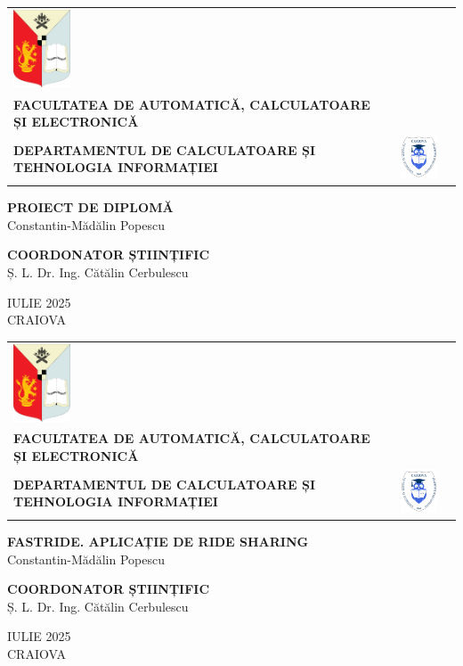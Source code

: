 \newcommand{\headerpage}[1]
{
\begin{center}
  \begin{tabular}{m{2cm} m{10cm} m{2cm}}
    \includegraphics[width=1.7cm]{Assets/left-logo.png} &
    \centering
    {\fontsize{10pt}{10pt}\selectfont
      \textbf{UNIVERSITATEA DIN CRAIOVA} \\[0.3em]
      \textbf{FACULTATEA DE AUTOMATICĂ, CALCULATOARE ȘI ELECTRONICĂ} \\[0.7em]
      \textbf{DEPARTAMENTUL DE CALCULATOARE ȘI TEHNOLOGIA INFORMAȚIEI}
    } &
    \includegraphics[width=1.7cm]{Assets/right-logo.png}
  \end{tabular}
\end{center}

\vspace{4cm}

\begin{center}
  {\fontsize{14pt}{14pt}\selectfont
   \textbf{#1} \\[1em]
  {Constantin-Mădălin Popescu}
  }
\end{center}

\vspace{3cm}

\begin{center}
   {\fontsize{12pt}{12pt}\selectfont
   \textbf{COORDONATOR ȘTIINȚIFIC} \\[1em]
   {Ș. L. Dr. Ing. Cătălin Cerbulescu}
   }
\end{center}

\vfill

\begin{center}
  {\fontsize{12pt}{12pt}\selectfont IULIE 2025 \\
  CRAIOVA}
\end{center}
}

\thispagestyle{empty}
\headerpage{PROIECT DE DIPLOMĂ}

\newpage
\thispagestyle{empty}
\headerpage{FASTRIDE. APLICAȚIE DE RIDE SHARING}

\newpage
\thispagestyle{empty}
\null
\newpage